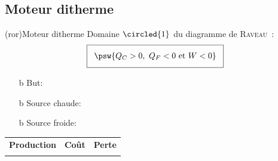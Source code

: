 \documentclass[../../main/main.tex]{subfiles}
\begin{document}
\subsection{Moteur ditherme}
\begin{tcb*}[sidebyside](ror){Moteur ditherme}
	Domaine $\circled{1}$ du diagramme de \textsc{Raveau}~:
	\begin{gather*}
		\setlength{\fboxsep}{3mm}
		\boxed{\psw{Q_C > 0,~Q_F < 0 \text{~et~} W < 0}}
	\end{gather*}
	\begin{itemize}
    \item[b]{But}: 
    \item[b]{\color{red}Source chaude}: 
    \item[b]{\color{blue}Source froide}: 
	\end{itemize}
  \begin{tabularx}{\linewidth}{YYY}
    \textbf{Production} &
    \textbf{Coût} &
    \textbf{Perte}
    \\
     &
     &
  \end{tabularx}
	\tcblower
	\begin{center}
		\vspace{-15pt}
	\end{center}
\end{tcb*}
\end{document}
